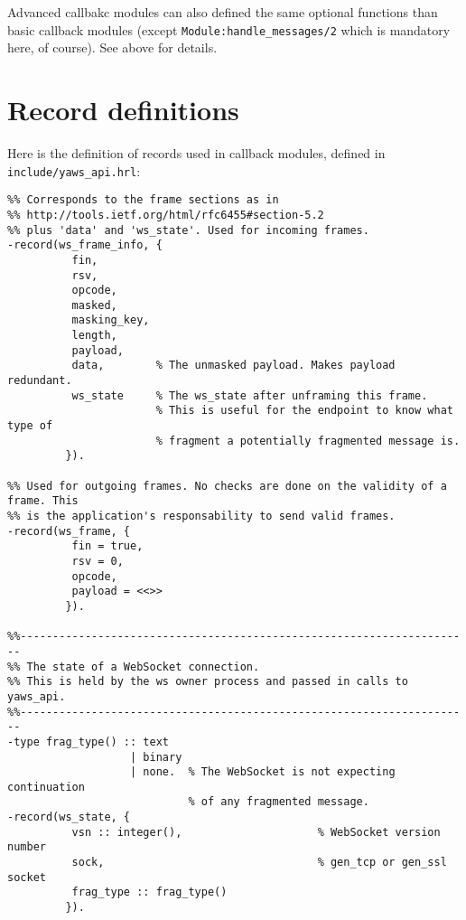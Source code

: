 \documentclass[11pt,oneside,english]{book}
\begin{document}
Advanced callbakc modules can also defined the same optional functions than
basic callback modules (except \verb+Module:handle_messages/2+ which is
mandatory here, of course). See above for details.


\section{Record definitions}

Here is the definition of records used in callback modules, defined in
\verb+include/yaws_api.hrl+:

\begin{verbatim}
%% Corresponds to the frame sections as in
%% http://tools.ietf.org/html/rfc6455#section-5.2
%% plus 'data' and 'ws_state'. Used for incoming frames.
-record(ws_frame_info, {
          fin,
          rsv,
          opcode,
          masked,
          masking_key,
          length,
          payload,
          data,        % The unmasked payload. Makes payload redundant.
          ws_state     % The ws_state after unframing this frame.
                       % This is useful for the endpoint to know what type of
                       % fragment a potentially fragmented message is.
         }).

%% Used for outgoing frames. No checks are done on the validity of a frame. This
%% is the application's responsability to send valid frames.
-record(ws_frame, {
          fin = true,
          rsv = 0,
          opcode,
          payload = <<>>
         }).

%%----------------------------------------------------------------------
%% The state of a WebSocket connection.
%% This is held by the ws owner process and passed in calls to yaws_api.
%%----------------------------------------------------------------------
-type frag_type() :: text
                   | binary
                   | none.  % The WebSocket is not expecting continuation
                            % of any fragmented message.
-record(ws_state, {
          vsn :: integer(),                     % WebSocket version number
          sock,                                 % gen_tcp or gen_ssl socket
          frag_type :: frag_type()
         }).
\end{verbatim}
\end{document}
